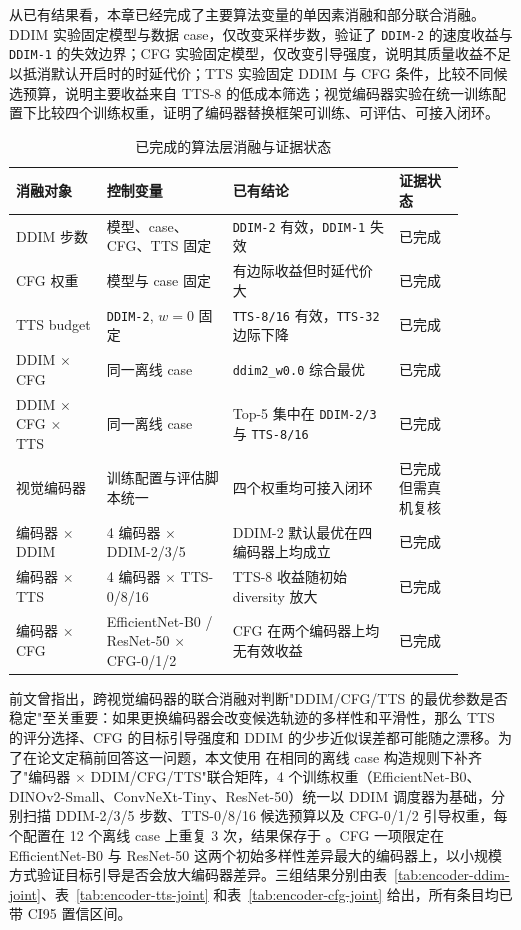 从已有结果看，本章已经完成了主要算法变量的单因素消融和部分联合消融。DDIM 实验固定模型与数据 case，仅改变采样步数，验证了 \texttt{DDIM-2} 的速度收益与 \texttt{DDIM-1} 的失效边界；CFG 实验固定模型，仅改变引导强度，说明其质量收益不足以抵消默认开启时的时延代价；TTS 实验固定 DDIM 与 CFG 条件，比较不同候选预算，说明主要收益来自 TTS-8 的低成本筛选；视觉编码器实验在统一训练配置下比较四个训练权重，证明了编码器替换框架可训练、可评估、可接入闭环。

\begin{table}[htbp]
    \centering
    \small
    \caption{已完成的算法层消融与证据状态}
    \label{tab:ablation-status}
    \begin{tabular}{p{0.18\linewidth}p{0.25\linewidth}p{0.33\linewidth}p{0.13\linewidth}}
        \toprule
        消融对象 & 控制变量 & 已有结论 & 证据状态 \\
        \midrule
        DDIM 步数 & 模型、case、CFG、TTS 固定 & \texttt{DDIM-2} 有效，\texttt{DDIM-1} 失效 & 已完成 \\
        CFG 权重 & 模型与 case 固定 & 有边际收益但时延代价大 & 已完成 \\
        TTS budget & \texttt{DDIM-2}, $w=0$ 固定 & \texttt{TTS-8/16} 有效，\texttt{TTS-32} 边际下降 & 已完成 \\
        DDIM $\times$ CFG & 同一离线 case & \texttt{ddim2\_w0.0} 综合最优 & 已完成 \\
        DDIM $\times$ CFG $\times$ TTS & 同一离线 case & Top-5 集中在 \texttt{DDIM-2/3} 与 \texttt{TTS-8/16} & 已完成 \\
        视觉编码器 & 训练配置与评估脚本统一 & 四个权重均可接入闭环 & 已完成但需真机复核 \\
        编码器 $\times$ DDIM & 4 编码器 $\times$ DDIM-2/3/5 & DDIM-2 默认最优在四编码器上均成立 & 已完成 \\
        编码器 $\times$ TTS & 4 编码器 $\times$ TTS-0/8/16 & TTS-8 收益随初始 diversity 放大 & 已完成 \\
        编码器 $\times$ CFG & EfficientNet-B0 / ResNet-50 $\times$ CFG-0/1/2 & CFG 在两个编码器上均无有效收益 & 已完成 \\
        \bottomrule
    \end{tabular}
\end{table}

前文曾指出，跨视觉编码器的联合消融对判断"DDIM/CFG/TTS 的最优参数是否稳定"至关重要：如果更换编码器会改变候选轨迹的多样性和平滑性，那么 TTS 的评分选择、CFG 的目标引导强度和 DDIM 的少步近似误差都可能随之漂移。为了在论文定稿前回答这一问题，本文使用  在相同的离线 case 构造规则下补齐了"编码器 $\times$ DDIM/CFG/TTS"联合矩阵，4 个训练权重（EfficientNet-B0、DINOv2-Small、ConvNeXt-Tiny、ResNet-50）统一以 DDIM 调度器为基础，分别扫描 DDIM-2/3/5 步数、TTS-0/8/16 候选预算以及 CFG-0/1/2 引导权重，每个配置在 12 个离线 case 上重复 3 次，结果保存于 。CFG 一项限定在 EfficientNet-B0 与 ResNet-50 这两个初始多样性差异最大的编码器上，以小规模方式验证目标引导是否会放大编码器差异。三组结果分别由表~\ref{tab:encoder-ddim-joint}、表~\ref{tab:encoder-tts-joint} 和表~\ref{tab:encoder-cfg-joint} 给出，所有条目均已带 CI95 置信区间。

